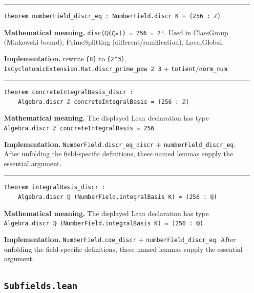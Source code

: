 \documentclass[UTF8,a4paper,11pt,fontset=fandol]{ctexart}
\theoremstyle{definition}
\newcommand{\statementsep}{\par\medskip\hrule\medskip}
\begin{document}
\statementsep
\begin{verbatim}
theorem numberField_discr_eq : NumberField.discr K = (256 : ℤ)
\end{verbatim}
\noindent\textbf{Mathematical meaning.} \texttt{disc(ℚ(ζ₈)) = 256 = 2⁸}. Used in ClassGroup (Minkowski bound), PrimeSplitting (different/ramification), LocalGlobal.\par
\noindent\textbf{Implementation.} rewrite \texttt{\{8\}} to \texttt{\{2\textasciicircum{}3\}}, \texttt{IsCyclotomicExtension.\allowbreak{}Rat.\allowbreak{}discr\_\allowbreak{}prime\_\allowbreak{}pow 2 3} + \texttt{totient}/\texttt{norm\_\allowbreak{}num}.\par
\statementsep
\begin{verbatim}
theorem concreteIntegralBasis_discr :
    Algebra.discr ℤ concreteIntegralBasis = (256 : ℤ)
\end{verbatim}
\noindent\textbf{Mathematical meaning.} The displayed Lean declaration has type \texttt{Algebra.\allowbreak{}discr ℤ concreteIntegralBasis = 256}.\par
\noindent\textbf{Implementation.} \texttt{NumberField.\allowbreak{}discr\_\allowbreak{}eq\_\allowbreak{}discr} + \texttt{numberField\_\allowbreak{}discr\_\allowbreak{}eq}. After unfolding the field-specific definitions, these named lemmas supply the essential argument.\par
\statementsep
\begin{verbatim}
theorem integralBasis_discr :
    Algebra.discr ℚ (NumberField.integralBasis K) = (256 : ℚ)
\end{verbatim}
\noindent\textbf{Mathematical meaning.} The displayed Lean declaration has type \texttt{Algebra.\allowbreak{}discr ℚ (NumberField.\allowbreak{}integralBasis K) = (256 : ℚ)}.\par
\noindent\textbf{Implementation.} \texttt{NumberField.\allowbreak{}coe\_\allowbreak{}discr} + \texttt{numberField\_\allowbreak{}discr\_\allowbreak{}eq}. After unfolding the field-specific definitions, these named lemmas supply the essential argument.\par

\subsection{\texttt{Subfields.lean}}
\end{document}
